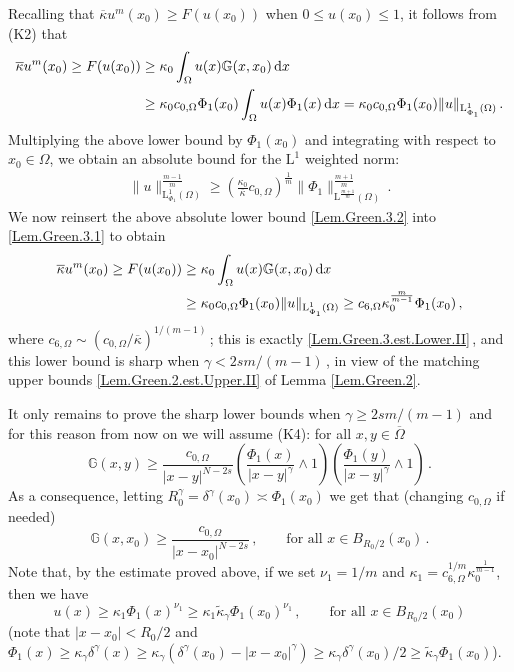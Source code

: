 \documentclass[11pt]{article}
\numberwithin{equation}{section}
\newcommand{\dx}{\,{\rm d}x}
\def\LL{\mathrm{L}} %
\newcommand{\n}{F}
\newcommand{\p}{{\delta^\gamma}} %
\newcommand{\ka}{\overline{\kappa}}
\newcommand{\K}{{\mathbb G}}
\begin{document}
Recalling that $\ka u^m(x_0) \ge \n(u(x_0))$ when $0\le u(x_0)\le 1$, it follows from (K2) that
\begin{equation}\label{Lem.Green.3.1}\begin{split}
\ka u^{m}(x_0) \ge \n(u(x_0))&\ge \kappa_0\int_\Omega u(x)\K(x,x_0)\dx\\
&\ge \kappa_0 c_{0,\Omega} \Phi_1(x_0)\int_\Omega u(x)\Phi_1(x)\dx = \kappa_0c_{0,\Omega} \Phi_1(x_0) \|u\|_{\LL^1_{\Phi_1}(\Omega)}\,.
\end{split}
\end{equation}
Multiplying the above lower bound by $\Phi_1(x_0)$ and integrating with respect to $x_0\in \Omega$, we obtain an absolute bound for the $\LL^1$ weighted norm:
\begin{equation}\label{Lem.Green.3.2}\begin{split}
\|u\|_{\LL^1_{\Phi_1}(\Omega)}^{\frac{m-1}{m}} \ge \left(\frac{\kappa_0}{\ka}c_{0,\Omega}\right)^{\frac{1}{m}} \|\Phi_1\|_{\LL^{\frac{m+1}{m}}(\Omega)}^{\frac{m+1}{m}}\,.
\end{split}
\end{equation}
We now reinsert the above absolute lower bound \eqref{Lem.Green.3.2} into \eqref{Lem.Green.3.1} to obtain
\begin{equation}\label{Lem.Green.3.3}\begin{split}
\ka u^m(x_0) \ge \n(u(x_0))&\ge \kappa_0\int_\Omega u(x)\K(x,x_0)\dx\\
&\ge \kappa_0c_{0,\Omega} \Phi_1(x_0) \|u\|_{\LL^1_{\Phi_1}(\Omega)}
\ge c_{6,\Omega}\kappa_0^{\frac{m}{m-1}} \Phi_1(x_0)\,,
\end{split}
\end{equation}
where $c_{6,\Omega}\sim (c_{0,\Omega}/\ka)^{1/(m-1)}$\,; this is exactly \eqref{Lem.Green.3.est.Lower.II}\,, and this lower bound is sharp  when $\gamma< 2s m/(m-1)$\,, in view of the matching upper bounds \eqref{Lem.Green.2.est.Upper.II} of Lemma \ref{Lem.Green.2}.

It only remains to prove the sharp lower bounds when $\gamma\geq 2s m/(m-1)$ and for this reason from now on we will assume (K4): for all $x,y\in\overline{\Omega}$
\begin{equation}\label{Lem.Green.3.K4}
\K(x,y)\ge \frac{c_{0,\Omega}}{|x-y|^{N-2s}}
\left(\frac{\Phi_1(x)}{|x-y|^\gamma}\wedge 1\right)
\left(\frac{\Phi_1(y)}{|x-y|^\gamma}\wedge 1\right)\,.
\end{equation}
As a consequence, letting $R_0^\gamma=\p(x_0)\asymp\Phi_1(x_0)$ we get that (changing $c_{0,\Omega}$ if needed)
\begin{equation}\label{Lem.Green.3.K4.1}
\K(x,x_0)\ge \frac{c_{0,\Omega}}{|x-x_0|^{N-2s}}\,,\qquad\mbox{for all }x\in B_{R_0/2}(x_0)\,.
\end{equation}
Note that, by the estimate proved above, if we set $\nu_1=1/m$ and $\kappa_1=c_{6,\Omega}^{1/m}\kappa_0^{\frac{1}{m-1}}$, then we have
\[
u(x)\ge \kappa_1\Phi_1(x)^{\nu_1}\ge \kappa_1\tilde{\kappa}_\gamma\Phi_1(x_0)^{\nu_1}\,,\qquad\mbox{for all }x\in B_{R_0/2}(x_0)
\]
(note that $|x-x_0|<R_0/2$ and $\Phi_1(x)\ge \kappa_\gamma\p(x)\ge \kappa_\gamma(\p(x_0)-|x-x_0|^\gamma)\ge \kappa_\gamma\p(x_0)/2\ge \tilde{\kappa}_\gamma\Phi_1(x_0)$).
\end{document}
